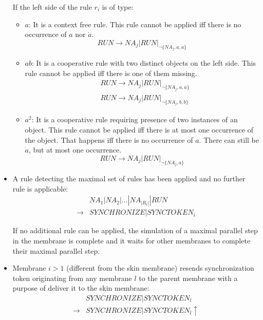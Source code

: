 \begin{dokaz}
\begin{itemize}
    If the left side of the rule $r_i$ is of type:
    \begin{itemize}
      \item $a$: It is a context free rule. This rule cannot be applied iff there is no occurrence of $a$ nor $\dot{a}$.
        $$\mathit{RUN} \rightarrow \mathit{NA_j}|\mathit{RUN}|_{\neg\{\mathit{NA_j}, a, \dot{a}\}}$$
      \item $ab$: It is a cooperative rule with two distinct objects on the left side. This rule cannot be applied iff there is one of them missing.
        \begin{align*}
          &\mathit{RUN} \rightarrow \mathit{NA_j}|\mathit{RUN}|_{\neg\{\mathit{NA_j}, a, \dot{a}\}}\\
          &\mathit{RUN} \rightarrow \mathit{NA_j}|\mathit{RUN}|_{\neg\{\mathit{NA_j}, b, \dot{b}\}}
        \end{align*}
      \item $a^2$: It is a cooperative rule requiring presence of two instances of an object. This rule cannot be applied iff there is at most one occurrence of the object. That happens iff there is no occurrence of $a$. There can still be $\dot{a}$, but at most one occurrence.
        $$\mathit{RUN} \rightarrow \mathit{NA_j}|\mathit{RUN}|_{\neg\{\mathit{NA_j}, a\}}$$
    \end{itemize}

    \item A rule detecting the maximal set of rules has been applied and no further rule is applicable:
    \begin{align*}
      &\mathit{NA_1}|\mathit{NA_2}|\dots|\mathit{NA_{|R_i|}}|\mathit{RUN} \\
      \rightarrow &\mathit{SYNCHRONIZE}|\mathit{SYNCTOKEN_i}
    \end{align*}

    If no additional rule can be applied, the simulation of a maximal parallel step in the membrane is complete and it waits for other membranes to complete their maximal parallel step.

    \item Membrane $i>1$ (different from the skin membrane) resends synchronization token originating from any membrane $l$ to the parent membrane with a purpose of deliver it to the skin membrane:
    \begin{align*}
      &\mathit{SYNCHRONIZE}|\mathit{SYNCTOKEN_l} \\
      \rightarrow &\mathit{SYNCHRONIZE}|\mathit{SYNCTOKEN_l}\uparrow
    \end{align*}


\end{itemize}
\end{dokaz}
